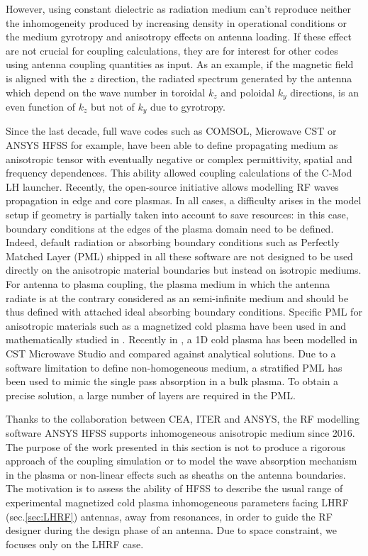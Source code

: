 However, using constant dielectric as radiation medium can't reproduce neither the inhomogeneity produced by increasing density in operational conditions or the medium gyrotropy and anisotropy effects on antenna loading. If these effect are not crucial for coupling calculations, they are for interest for other codes using antenna coupling quantities as input. As an example, if the magnetic field is aligned with the $z$ direction, the radiated spectrum generated by the antenna which depend on the wave number in toroidal $k_z$ and poloidal $k_y$ directions, is an even function of $k_z$ but not of $k_y$ due to gyrotropy.

Since the last decade, full wave codes such as {COMSOL}, Microwave {CST} or {ANSYS} {HFSS} for example, have been able to define propagating medium as anisotropic tensor with eventually negative or complex permittivity, spatial and frequency dependences. This ability allowed coupling calculations of the C-Mod LH launcher\cite{meneghini2009-1}. Recently, the open-source initiative \cite{shiraiwa2017-1} allows modelling RF waves propagation in edge and core plasmas. In all cases, a difficulty arises in the model setup if  geometry is partially taken into account to save resources: in this case, boundary conditions at the edges of the plasma domain need to be defined. Indeed, default radiation or absorbing boundary conditions such as Perfectly Matched Layer (PML) shipped in all these software are not designed to be used directly on the anisotropic material boundaries but instead on isotropic mediums. For antenna to plasma coupling, the plasma medium in which the antenna radiate is at the contrary considered as an semi-infinite medium and should be thus defined with attached ideal absorbing boundary conditions. Specific PML for anisotropic materials such as a magnetized cold plasma have been used in \cite{jacquot2013, colas2019} and mathematically studied in  \cite{becache2017}. Recently in \cite{louche2017}, a 1D cold plasma has been modelled in CST Microwave Studio and compared against analytical solutions. Due to a software limitation to define non-homogeneous medium, a stratified PML has been used to mimic the single pass absorption in a bulk plasma. To obtain a precise solution, a large number of layers are required in the PML. 

Thanks to the collaboration between CEA, ITER and ANSYS, the RF modelling software ANSYS HFSS supports inhomogeneous anisotropic medium since 2016. The purpose of the work presented in this section is not to produce a rigorous approach of the coupling simulation or to model the wave absorption mechanism in the plasma or non-linear effects such as sheaths  on the antenna boundaries. The motivation is to assess the ability of HFSS to describe the usual range of experimental magnetized cold plasma inhomogeneous parameters facing LHRF (sec.\ref{sec:LHRF}) antennas, away from resonances, in order to guide the RF designer during the design phase of an antenna. Due to space constraint, we focuses only on the LHRF case.%

